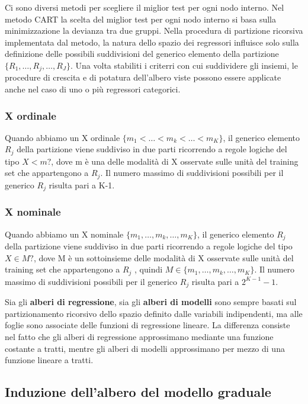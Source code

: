 \documentclass[a4paper]{extarticle}
\begin{document}
Ci sono diversi metodi per scegliere il miglior test per ogni nodo interno. Nel metodo CART la scelta del miglior test per ogni nodo interno si basa sulla minimizzazione la devianza tra due gruppi. Nella procedura di partizione ricorsiva implementata dal metodo, la natura dello spazio dei regressori influisce solo sulla definizione delle possibili suddivisioni del generico elemento della partizione $\{R_1,\dots,R_j,\dots,R_J\}$. Una volta stabiliti i criterri con cui suddividere gli insiemi, le procedure di crescita e di potatura dell'albero viste possono essere applicate anche nel caso di uno o più regressori categorici.

\subsubsection{X ordinale}

Quando abbiamo un X ordinale $\{m_1 < \dots < m_k < \dots <m_K \}$, il generico elemento $R_j$ della partizione viene suddiviso in due parti ricorrendo a regole logiche del tipo $X<m?$, dove m è una delle modalità di X osservate sulle unità del training set che appartengono a $R_j$. Il numero massimo di suddivisioni possibili per il generico $R_j$ risulta pari a K-1.

\subsubsection{X nominale}

Quando abbiamo un X nominale $\{m_1,\dots, m_k,\dots, m_K \}$, il generico elemento $R_j$ della partizione viene suddiviso in due parti ricorrendo a regole logiche del tipo $X \in M ?$, dove M è un sottoinsieme delle modalità di X osservate sulle unità del training set che appartengono a $R_j$ , quindi $M \in \{m_1,\dots, m_k,\dots, m_K \}$. Il numero massimo di suddivisioni possibili per il generico $R_j$ risulta pari a $2^{K-1}-1$.

Sia gli \textbf{alberi di regressione}, sia gli \textbf{alberi di modelli} sono sempre basati sul partizionamento ricorsivo dello spazio definito dalle variabili indipendenti, ma alle foglie sono associate delle funzioni di regressione lineare. La differenza consiste nel fatto che gli alberi di regressione approssimano mediante una funzione costante a tratti, mentre gli alberi di modelli approssimano per mezzo di una funzione lineare a tratti.

\subsection{Induzione dell'albero del modello graduale}
\end{document}
